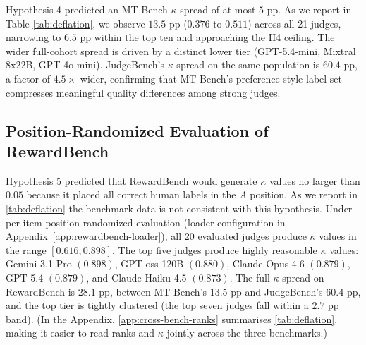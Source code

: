 \documentclass[11pt]{article}
\begin{document}

Hypothesis 4 predicted an MT-Bench $\kappa$ spread of at most $5$ pp. As we report in Table \ref{tab:deflation}, we observe $13.5$ pp ($0.376$ to $0.511$) across all 21 judges, narrowing to $6.5$ pp within the top ten and approaching the H4 ceiling. The wider full-cohort spread is driven by a distinct lower tier (GPT-5.4-mini, Mixtral 8x22B, GPT-4o-mini). JudgeBench's $\kappa$ spread on the same population is $60.4$ pp, a factor of $4.5\times$ wider, confirming that MT-Bench's preference-style label set compresses meaningful quality differences among strong judges.

\subsection{Position-Randomized Evaluation of RewardBench}


Hypothesis 5 predicted that RewardBench would generate $\kappa$ values no larger than $0.05$ because it placed all correct human labels in the \textit{A} position. As we report in \autoref{tab:deflation} the benchmark data is not consistent with this hypothesis. Under per-item position-randomized evaluation (loader configuration in Appendix~\ref{app:rewardbench-loader}), all 20 evaluated judges produce $\kappa$ values in the range $[0.616, 0.898]$. The top five judges produce highly reasonable $\kappa$ values: Gemini 3.1 Pro $(0.898)$, GPT-oss 120B $(0.880)$, Claude Opus 4.6 $(0.879)$, GPT-5.4 $(0.879)$, and Claude Haiku 4.5 $(0.873)$. The full $\kappa$ spread on RewardBench is $28.1$ pp, between MT-Bench's $13.5$ pp and JudgeBench's $60.4$ pp, and the top tier is tightly clustered (the top seven judges fall within a $2.7$ pp band). (In the Appendix, \autoref{app:cross-bench-ranks} summarises \autoref{tab:deflation}, making it easier to read ranks and $\kappa$ jointly across the three benchmarks.)
\end{document}
